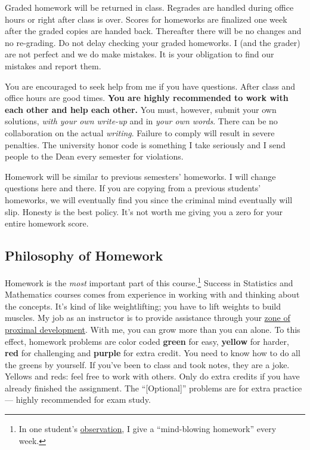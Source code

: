 \documentclass[12pt]{article}
\newcommand{\ingreen}[1]{\color{green}\textbf{#1} \color{black}}
\newcommand{\inyellow}[1]{\color{yellow}\textbf{#1} \color{black}}
\newcommand{\inred}[1]{\color{red}\textbf{#1} \color{black}}
\newcommand{\inpurple}[1]{\color{purple}\textbf{#1} \color{black}}
\newcommand{\qu}[1]{``#1''}
\begin{document}
Graded homework will be returned in class. Regrades are handled during office hours or right after class is over. Scores for homeworks are finalized one week after the graded copies are handed back. Thereafter there will be no changes and no re-grading. Do not delay checking your graded homeworks. I (and the grader) are not perfect and we do make mistakes. It is your obligation to find our mistakes and report them.

You are encouraged to seek help from me if you have questions. After class and office hours are good times. \ingreen{You are highly recommended to work with each other and help each other.} You must, however, submit your own solutions, \textit{with your own write-up} and in \textit{your own words}. There can be no collaboration on the actual \textit{writing}. Failure to comply will result in severe penalties. The university honor code is something I take seriously and I send people to the Dean every semester for violations.

Homework will be similar to previous semesters' homeworks. I will change questions here and there. If you are copying from a previous students' homeworks, we will eventually find you since the criminal mind eventually will slip. Honesty is the best policy. It's not worth me giving you a zero for your entire homework score.

\subsection*{Philosophy of Homework}


Homework is the \textit{most} important part of this course.\footnote{In one student's \href{http://www.ratemyprofessors.com/ShowRatings.jsp?tid=1951051}{observation}, I give a \qu{mind-blowing homework} every week.} Success in Statistics and Mathematics courses comes from experience in working with and thinking about the concepts. It's kind of like weightlifting; you have to lift weights to build muscles. My job as an instructor is to provide assistance through your \href{http://en.wikipedia.org/wiki/Zone_of_proximal_development}{zone of proximal development}. With me, you can grow more than you can alone. To this effect, homework problems are color coded \ingreen{green} for easy, \inyellow{yellow} for harder, \inred{red} for challenging and \inpurple{purple} for extra credit. You need to know how to do all the greens by yourself. If you've been to class and took notes, they are a joke. Yellows and reds: feel free to work with others. Only do extra credits if you have already finished the assignment. The \qu{[Optional]} problems are for extra practice --- highly recommended for exam study.
\end{document}
